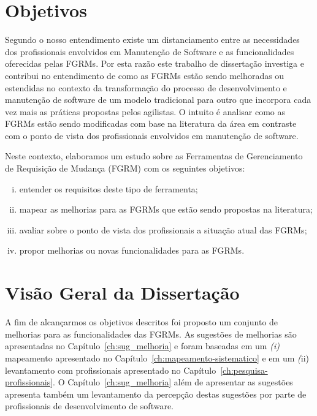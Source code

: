 \section{Objetivos}
\label{sec:intro-objetivos}

Segundo o nosso entendimento existe um distanciamento entre as necessidades dos
profissionais envolvidos em Manutenção de Software e as funcionalidades
oferecidas pelas FGRMs\@. Por esta razão este trabalho de dissertação investiga
e contribui no entendimento de como as FGRMs estão sendo melhoradas ou
estendidas no contexto da transformação do processo de desenvolvimento e
manutenção de software de um modelo tradicional para outro que incorpora cada
vez mais as práticas propostas pelos agilistas. O intuito é analisar como as
FGRMs estão sendo modificadas com base na literatura da área em contraste com o
ponto de vista dos profissionais envolvidos em manutenção de software.

Neste contexto, elaboramos um estudo sobre as Ferramentas de Gerenciamento de
Requisição de Mudança (FGRM) com os seguintes objetivos:
\begin{enumerate}[(i)]
	\item entender os requisitos deste tipo de ferramenta;
	\item mapear as melhorias para as FGRMs que estão sendo propostas na
		literatura;
	\item avaliar sobre o ponto de vista dos profissionais a
		situação atual das FGRMs\@;
	\item propor melhorias ou novas funcionalidades para as FGRMs\@.
\end{enumerate}


\section{Visão Geral da Dissertação}
\label{sec:intro-visao-geral}

A fim de alcançarmos os objetivos descritos foi proposto um conjunto de
melhorias para as funcionalidades das FGRMs. As sugestões de melhorias são
apresentadas no Capítulo~\ref{ch:sug_melhoria} e foram baseadas em um
\textit{(i)} mapeamento apresentado no Capítulo~\ref{ch:mapeamento-sistematico}
e em um \textit(ii) levantamento com profissionais apresentado no
Capítulo~\ref{ch:pesquisa-profissionais}. O Capítulo~\ref{ch:sug_melhoria} além
de apresentar as sugestões apresenta também um levantamento da percepção destas
sugestões por parte de profissionais de desenvolvimento de software.

